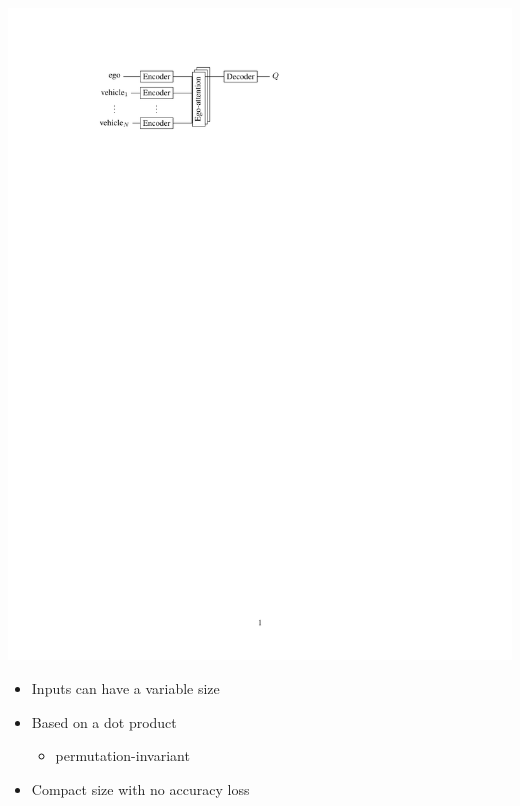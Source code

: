 \documentclass[a0paper,portrait,fontscale=0.3, margin=2cm]{baposter}
\begin{document}
\begin{poster}
{\begin{center}
	\begin{minipage}{0.4\textwidth}
		\includegraphics[trim={3.8cm 22.5cm 10cm 2.5cm}, clip, page=1, width=\linewidth]{img/architecture}
		\begin{itemize}
			\item[\hlg{\checkmark}] Inputs can have a {variable size}
			\item[\hlg{\checkmark}] Based on a dot product
			\begin{itemize}
				\item[$\incarrow$] {permutation-invariant}
			\end{itemize}
			\item[\hlg{\checkmark}] Compact size with no accuracy loss
		\end{itemize}
	\end{minipage}
	\begin{minipage}{0.59\textwidth}

\end{minipage}
\end{center}}
\end{poster}
\end{document}
